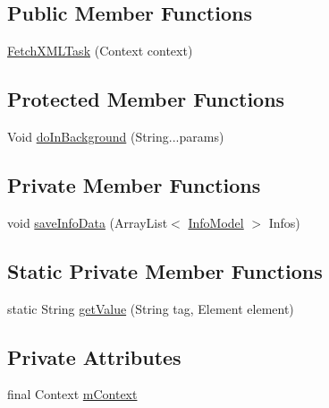 \subsection*{Public Member Functions}
\begin{DoxyCompactItemize}
\item 
\hyperlink{classorg_1_1buildmlearn_1_1toolkit_1_1infotemplate_1_1data_1_1FetchXMLTask_abe6ca875ad1665ab2386f6d9ac6ac5c7}{Fetch\+X\+M\+L\+Task} (Context context)
\end{DoxyCompactItemize}
\subsection*{Protected Member Functions}
\begin{DoxyCompactItemize}
\item 
Void \hyperlink{classorg_1_1buildmlearn_1_1toolkit_1_1infotemplate_1_1data_1_1FetchXMLTask_af223210e4cf183364c0ca3a220fc3c28}{do\+In\+Background} (String...\+params)
\end{DoxyCompactItemize}
\subsection*{Private Member Functions}
\begin{DoxyCompactItemize}
\item 
void \hyperlink{classorg_1_1buildmlearn_1_1toolkit_1_1infotemplate_1_1data_1_1FetchXMLTask_af3a8aceeb5aaadef03e04dcd0c4dd49f}{save\+Info\+Data} (Array\+List$<$ \hyperlink{classorg_1_1buildmlearn_1_1toolkit_1_1infotemplate_1_1data_1_1InfoModel}{Info\+Model} $>$ Infos)
\end{DoxyCompactItemize}
\subsection*{Static Private Member Functions}
\begin{DoxyCompactItemize}
\item 
static String \hyperlink{classorg_1_1buildmlearn_1_1toolkit_1_1infotemplate_1_1data_1_1FetchXMLTask_ae9b145edaa50d99cb6d2d7bea9c11e90}{get\+Value} (String tag, Element element)
\end{DoxyCompactItemize}
\subsection*{Private Attributes}
\begin{DoxyCompactItemize}
\item 
final Context \hyperlink{classorg_1_1buildmlearn_1_1toolkit_1_1infotemplate_1_1data_1_1FetchXMLTask_ae64350a3efe9e1ef9b72490787c91c9b}{m\+Context}
\end{DoxyCompactItemize}


